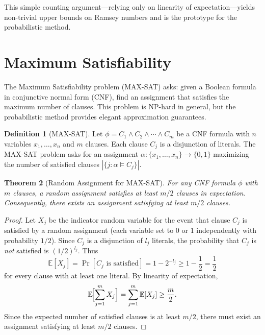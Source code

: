 \documentclass[twoside,12pt]{book}
\theoremstyle{plain}
\newtheorem{theorem}{Theorem}[chapter]
\theoremstyle{definition}
\newtheorem{definition}[theorem]{Definition}
\theoremstyle{remark}
\begin{document}
This simple counting argument---relying only on linearity of
expectation---yields non-trivial upper bounds on Ramsey numbers and is
the prototype for the probabilistic method.

\section{Maximum Satisfiability}
\label{sec:maxsat}

The Maximum Satisfiability problem (MAX-SAT) asks: given a Boolean
formula in conjunctive normal form (CNF), find an assignment that
satisfies the maximum number of clauses. This problem is NP-hard in
general, but the probabilistic method provides elegant approximation
guarantees.

\begin{definition}[MAX-SAT]
Let $\phi = C_1 \wedge C_2 \wedge \cdots \wedge C_m$ be a CNF formula
with $n$ variables $x_1, \ldots, x_n$ and $m$ clauses. Each clause $C_j$
is a disjunction of literals. The MAX-SAT problem asks for an assignment
$\alpha : \{x_1, \ldots, x_n\} \to \{0, 1\}$ maximizing the number of
satisfied clauses $|\{j : \alpha \models C_j\}|$.
\end{definition}

\begin{theorem}[Random Assignment for MAX-SAT]
\label{thm:maxsat-random}
For any CNF formula $\phi$ with $m$ clauses, a random assignment satisfies
at least $m/2$ clauses in expectation. Consequently, there exists an
assignment satisfying at least $m/2$ clauses.
\end{theorem}

\begin{proof}
Let $X_j$ be the indicator random variable for the event that clause $C_j$
is satisfied by a random assignment (each variable set to $0$ or $1$
independently with probability $1/2$). Since $C_j$ is a disjunction of
$l_j$ literals, the probability that $C_j$ is \emph{not} satisfied is
$(1/2)^{l_j}$. Thus
\[
\mathbb{E}[X_j] = \Pr[C_j \text{ is satisfied}] = 1 - 2^{-l_j} \geq 1 - \frac{1}{2} = \frac{1}{2}
\]
for every clause with at least one literal. By linearity of expectation,
\[
\mathbb{E}\!\Bigl[\sum_{j=1}^{m} X_j\Bigr] = \sum_{j=1}^{m} \mathbb{E}[X_j]
\geq \frac{m}{2}.
\]
Since the expected number of satisfied clauses is at least $m/2$, there
must exist an assignment satisfying at least $m/2$ clauses.
\end{proof}
\end{document}
